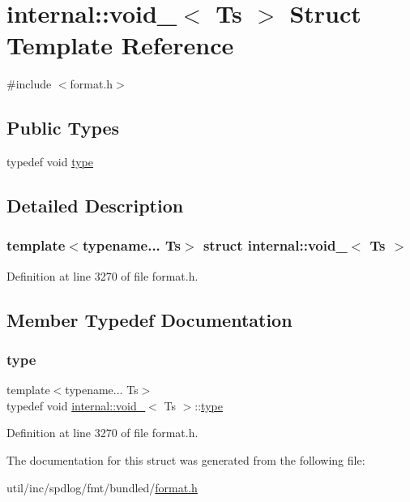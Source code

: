 \hypertarget{structinternal_1_1void__}{}\section{internal\+:\+:void\+\_\+$<$ Ts $>$ Struct Template Reference}
\label{structinternal_1_1void__}


{\ttfamily \#include $<$format.\+h$>$}

\subsection*{Public Types}
\begin{DoxyCompactItemize}
\item 
typedef void \hyperlink{structinternal_1_1void___a1f4b0563b00ae7e390fc319bb817e341}{type}
\end{DoxyCompactItemize}


\subsection{Detailed Description}
\subsubsection*{template$<$typename... Ts$>$\newline
struct internal\+::void\+\_\+$<$ Ts $>$}



Definition at line 3270 of file format.\+h.



\subsection{Member Typedef Documentation}
\mbox{\label{structinternal_1_1void___a1f4b0563b00ae7e390fc319bb817e341}} 
\subsubsection{\texorpdfstring{type}{type}}
{\footnotesize\ttfamily template$<$typename... Ts$>$ \\
typedef void \hyperlink{structinternal_1_1void__}{internal\+::void\+\_\+}$<$ Ts $>$\+::\hyperlink{structinternal_1_1void___a1f4b0563b00ae7e390fc319bb817e341}{type}}



Definition at line 3270 of file format.\+h.



The documentation for this struct was generated from the following file\+:\begin{DoxyCompactItemize}
\item 
util/inc/spdlog/fmt/bundled/\hyperlink{format_8h}{format.\+h}\end{DoxyCompactItemize}

